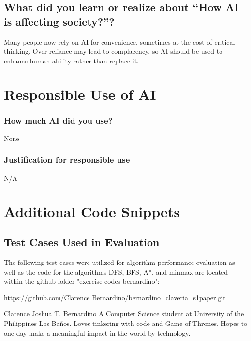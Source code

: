 \documentclass[journal]{./IEEE/IEEEtran}
\begin{document}
\subsection{What did you learn or realize about “How AI is affecting society?”?}
Many people now rely on AI for convenience, sometimes at the cost of critical thinking. Over-reliance 
may lead to complacency, so AI should be used to enhance human ability rather than replace it.  

\section{Responsible Use of AI}

\subsubsection{How much AI did you use? }
None
\subsubsection{Justification for responsible use}
N/A
\appendix

\section{Additional Code Snippets}
\subsection{Test Cases Used in Evaluation}
The following test cases were utilized for algorithm performance evaluation as well as the code for the algorithms DFS, BFS, A*, and minmax are located within the github folder "exercise codes bernardino":

\url{https://github.com/Clarence Bernardino/bernardino_claveria_s1paper.git}





\begin{biography}{Clarence Joshua T. Bernardino} A Computer Science student at University of the Philippines Los Baños. Loves tinkering with code and Game of Thrones. Hopes to one day make a meaningful impact in the world by technology. 
\end{biography}

\newpage
\clearpage
\end{document}
